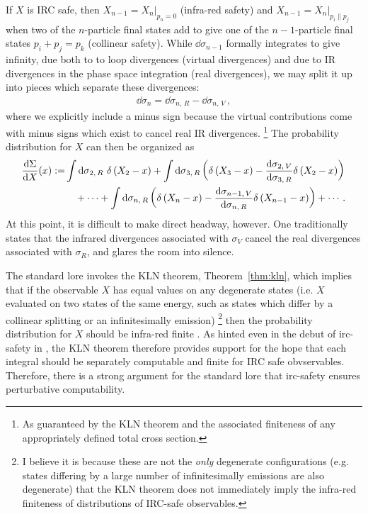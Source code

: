 If \(X\) is IRC safe, then \(X_{n-1} = X_n \big|_{p_n = 0}\) (infra-red safety) and \(X_{n-1} = X_n \big|_{p_i \parallel p_j}\) when two of the \(n\)-particle final states add to give one of the \(n-1\)-particle final states \(p_i + p_j = p_k\) (collinear safety).
%
While \(\dd\sigma_{n-1}\) formally integrates to give infinity, due both to to loop divergences (virtual divergences) and due to IR divergences in the phase space integration (real divergences), we may split it up into pieces which separate these divergences:
\begin{align}
    \dd \sigma_{n} = \dd \sigma_{n,\,R} - \dd \sigma_{n,\,V}
    \,,
\end{align}
where we explicitly include a minus sign because the virtual contributions come with minus signs which exist to cancel real IR divergences.%
\footnote{
    As guaranteed by the KLN theorem and the associated finiteness of any appropriately defined total cross section.
}
%
The probability distribution for \(X\) can then be organized as
\begin{equation}
\begin{aligned}
    \label{eq:prob_distribution}
    \frac{\dd\Sigma}{\dd X}(x)
    :=
    &
    \int \dd\sigma_{2,\,R} \,\,\delta\le(X_2 - x\ri)
    +
    \int \dd\sigma_{3,\,R} \le(
        \delta\le(X_3 - x\ri)
        -
        \frac{\dd \sigma_{2,\,V}}{\dd\sigma_{3,\,R}}
        \delta\le(X_2 - x\ri)
    \ri)
    \\
    &
    \quad
    +
    \cdots
    +
    \int \dd\sigma_{n,\,R} \le(
        \delta\le(X_n - x\ri)
        -
        \frac{\dd \sigma_{n-1,\,V}}{\dd\sigma_{n,\,R}}
        \delta\le(X_{n-1} - x\ri)
    \ri)
    +
    \cdots
    \,.
\end{aligned}
\end{equation}
%
At this point, it is difficult to make direct headway, however.
%
One traditionally states that the infrared divergences associated with \(\sigma_V\) cancel the real divergences associated with \(\sigma_R\), and glares the room into silence.


The standard lore invokes the KLN theorem, Theorem~\ref{thm:kln}, which implies that if the observable \(X\) has equal values on any degenerate states (i.e. \(X\) evaluated on two states of the same energy, such as states which differ by a collinear splitting or an infinitesimally  emission)%
\footnote{
    I believe it is because these are not the \textit{only} degenerate configurations (e.g. states differing by a large number of infinitesimally  emissions are also degenerate) that the KLN theorem does not immediately imply the infra-red finiteness of distributions of IRC-safe observables.
}%
then the probability distribution for \(X\) should be infra-red finite \cite{Kinoshita:1962ur,Lee:1964is}.
%
As hinted even in the debut of \gls{irc-safety} in , the KLN theorem therefore provides support for the hope that each integral should be separately computable and finite for IRC safe obvservables.
%
Therefore, there is a strong argument for the standard lore that \gls{irc-safety} ensures perturbative computability.


